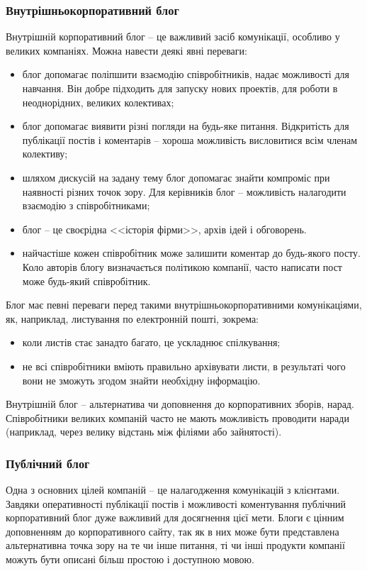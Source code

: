 \subsubsection{Внутрішньокорпоративний блог}
Внутрішній корпоративний блог -- це важливий засіб комунікації, особливо у великих компаніях. 
Можна навести деякі явні переваги:
\begin{itemize}
\item блог допомагає поліпшити взаємодію співробітників, надає можливості для навчання. Він добре підходить для запуску нових проектів, для роботи в неоднорідних, великих колективах;
\item блог допомагає виявити різні погляди на будь-яке питання. Відкритість для публікації постів і коментарів -- хороша можливість висловитися всім членам колективу;
\item шляхом дискусій на задану тему блог допомагає знайти компроміс при наявності різних точок зору.
Для керівників блог -- можливість налагодити взаємодію з співробітниками;
\item блог -- це своєрідна <<історія фірми>>, архів ідей і обговорень.
\item найчастіше кожен співробітник може залишити коментар до будь-якого посту. Коло авторів блогу визначається політикою компанії, часто написати пост може будь-який співробітник.
\end{itemize}


Блог має певні переваги перед такими внутрішньокорпоративними комунікаціями, як, наприклад, листування по електронній пошті, зокрема:

\begin{itemize}
\item коли листів стає занадто багато, це ускладнює спілкування;
\item не всі співробітники вміють правильно архівувати листи, в результаті чого вони не зможуть згодом знайти необхідну інформацію.
\end{itemize}

Внутрішній блог -- альтернатива чи доповнення до корпоративних зборів, нарад. 
Співробітники великих компаній часто не мають можливість проводити наради (наприклад, через велику відстань між філіями або зайнятості).

\subsubsection{Публічний блог}
Одна з основних цілей компаній -- це налагодження комунікацій з клієнтами.
Завдяки оперативності публікації постів і можливості коментування публічний корпоративний блог дуже важливий для досягнення цієї мети.
Блоги є цінним доповненням до корпоративного сайту, так як в них може бути представлена альтернативна точка зору на те чи інше питання, ті чи інші продукти компанії можуть бути описані більш простою і доступною мовою.
